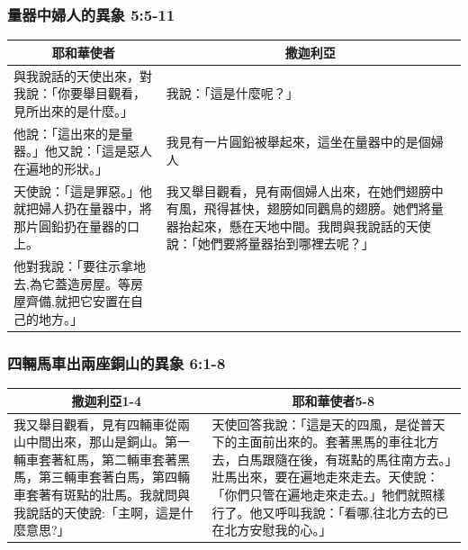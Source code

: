 \subsubsection{量器中婦人的異象 5:5-11}
\begin{table}[H]
\centering
\begin{tabular}{p{6.75cm}|p{}}\hline\hline
\multicolumn{1}{c|}{耶和華使者}&\multicolumn{1}{c}{撒迦利亞}\\\hline
與我說話的天使出來，對我說：「你要舉目觀看，見所出來的是什麼。」&我說：「這是什麼呢？」\\\hline
他說：「這出來的是量器。」他又說：「這是惡人在遍地的形狀。」&我見有一片圓鉛被舉起來，這坐在量器中的是個婦人\\\hline
天使說：「這是罪惡。」他就把婦人扔在量器中，將那片圓鉛扔在量器的口上。&我又舉目觀看，見有兩個婦人出來，在她們翅膀中有風，飛得甚快，翅膀如同鸛鳥的翅膀。她們將量器抬起來，懸在天地中間。我問與我說話的天使說：「她們要將量器抬到哪裡去呢？」\\\hline
他對我說：「要往示拿地去,為它蓋造房屋。等房屋齊備,就把它安置在自己的地方。」&\\\hline
\end{tabular}
\end{table}

\subsubsection{四輛馬車出兩座銅山的異象 6:1-8}
\begin{table}[H]
\centering
\begin{tabular}{p{6.75cm}|p{}}\hline\hline
\multicolumn{1}{c|}{撒迦利亞1-4}&\multicolumn{1}{c}{耶和華使者5-8}\\\hline
我又舉目觀看，見有四輛車從兩山中間出來，那山是銅山。第一輛車套著紅馬，第二輛車套著黑馬，第三輛車套著白馬，第四輛車套著有斑點的壯馬。我就問與我說話的天使說:「主啊，這是什麼意思?」&天使回答我說：「這是天的四風，是從普天下的主面前出來的。套著黑馬的車往北方去，白馬跟隨在後，有斑點的馬往南方去。」壯馬出來，要在遍地走來走去。天使說：「你們只管在遍地走來走去。」牠們就照樣行了。他又呼叫我說：「看哪,往北方去的已在北方安慰我的心。」\\\hline
\end{tabular}
\end{table}
	 
